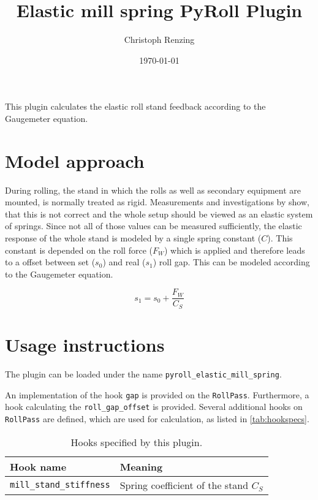 \documentclass[11pt]{PyRollDocs}
\begin{document}
    \title{Elastic mill spring PyRoll Plugin}
    \author{Christoph Renzing}
    \date{\today}

    \maketitle

    This plugin calculates the elastic roll stand feedback according to the Gaugemeter equation.


    \section{Model approach}\label{sec:model-approach}

    During rolling, the stand in which the rolls as well as secondary equipment are mounted, is normally treated as rigid.
    Measurements and investigations by \textcite{Weber1973} show, that this is not correct and the whole setup should be viewed as an elastic system of springs.
    Since not all of those values can be measured sufficiently, the elastic response of the whole stand is modeled by a single spring constant ($C$).
    This constant is depended on the roll force ($F_W$) which is applied and therefore leads to a offset between set ($s_0$) and real ($s_1$) roll gap.
    This can be modeled according to the Gaugemeter equation.

    \begin{equation}
        s_1 = s_0 + \frac{F_W}{C_S}
        \label{eq:gaugemeter-equation}
    \end{equation}


    \section{Usage instructions}\label{sec:usage-instructions}

    The plugin can be loaded under the name \texttt{pyroll\_elastic\_mill\_spring}.

    An implementation of the hook \lstinline{gap} is provided on the \lstinline{RollPass}.
    Furthermore, a hook calculating the \lstinline{roll_gap_offset} is provided.
    Several additional hooks on \lstinline{RollPass} are defined, which are used for calculation, as listed in \autoref{tab:hookspecs}.

    \begin{table}
        \centering
        \caption{Hooks specified by this plugin.}
        \label{tab:hookspecs}
        \begin{tabular}{ll}
            \toprule
            Hook name                       & Meaning                              \\
            \midrule
            \texttt{mill\_stand\_stiffness} & Spring coefficient of the stand  $C_S$ \\
            \bottomrule
        \end{tabular}
    \end{table}

    \printbibliography
\end{document}
